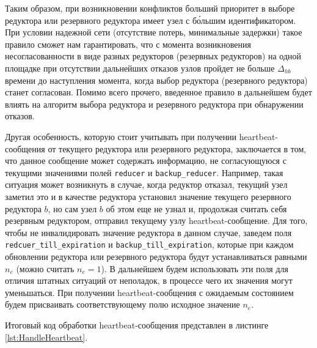 \documentclass{article}
\theoremstyle{plain}
\theoremstyle{plain}
\theoremstyle{plain}
\theoremstyle{plain}
\theoremstyle{definition}
\theoremstyle{remark}
\theoremstyle{plain}
\begin{document}
Таким образом, при возникновении конфликтов больший приоритет в выборе редуктора или резервного редуктора имеет узел с б\'{о}льшим идентификатором. При условии надежной сети (отсутствие потерь, минимальные задержки) такое правило сможет нам гарантировать, что с момента возникновения несогласованности в виде разных редукторов (резервных редукторов) на одной площадке при отсутствии дальнейших отказов узлов пройдет не больше $\Delta_{hb}$ времени до наступления момента, когда выбор редуктора (резервного редуктора) станет согласован. Помимо всего прочего, введенное правило в дальнейшем будет влиять на алгоритм выбора редуктора и резервного редуктора при обнаружении отказов.

Другая особенность, которую стоит учитывать при получении heartbeat-со\-об\-ще\-ния от текущего редуктора или резервного редуктора, заключается в том, что данное сообщение может содержать информацию, не согласующуюся с текущими значениями полей \texttt{reducer} и \texttt{backup\_reducer}. Например, такая ситуация может возникнуть в случае, когда редуктор отказал, текущий узел заметил это и в качестве редуктора установил значение текущего резервного редуктора $b$, но сам узел $b$ об этом еще не узнал и, продолжая считать себя резервным редуктором, отправил текущему узлу heartbeat-со\-об\-ще\-ние. Для того, чтобы не инвалидировать значение редуктора в данном случае, заведем поля \texttt{redcuer\_till\_expiration} и \texttt{backup\_till\_expiration}, которые при каждом обновлении редуктора или резервного редуктора будут устанавливаться равными $n_e$ (можно считать $n_e = 1$). В дальнейшем будем использовать эти поля для отличия штатных ситуаций от неполадок, в процессе чего их значения могут уменьшаться. При получении heartbeat-со\-об\-ще\-ния с ожидаемым состоянием будем присваивать соответствующему полю исходное значение $n_e$.

Итоговый код обработки heartbeat-со\-об\-ще\-ния представлен в листинге \ref{lst:HandleHeartbeat}.
\end{document}
